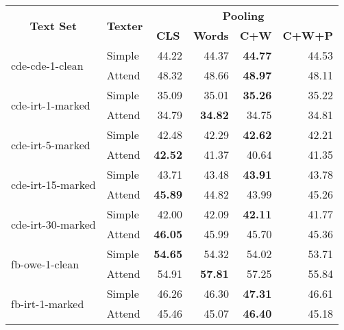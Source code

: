 \begin{tabular}{| l | l | r | r | r | r |}
    \hline

    \multicolumn{1}{|c|}{\multirow{2}{*}{\textbf{Text Set}}} &
    \multicolumn{1}{|c|}{\multirow{2}{*}{\textbf{Texter}}} &
    \multicolumn{4}{|c|}{\textbf{Pooling}} \\

    &
    &
    \multicolumn{1}{|c|}{\textbf{CLS}} &
    \multicolumn{1}{|c|}{\textbf{Words}} &
    \multicolumn{1}{|c|}{\textbf{C+W}} &
    \multicolumn{1}{|c|}{\textbf{C+W+P}} \\

    \hline \hline

    \multirow{2}{*}{cde-cde-1-clean}
    & Simple & 44.22 & 44.37 & \textbf{44.77} & 44.53 \\
    & Attend & 48.32 & 48.66 & \textbf{48.97} & 48.11 \\ \hline

    \multirow{2}{*}{cde-irt-1-marked}
    & Simple & 35.09 & 35.01 & \textbf{35.26} & 35.22 \\
    & Attend & 34.79 & \textbf{34.82} & 34.75 & 34.81 \\ \hline

    \multirow{2}{*}{cde-irt-5-marked}
    & Simple & 42.48 & 42.29 & \textbf{42.62} & 42.21 \\
    & Attend & \textbf{42.52} & 41.37 & 40.64 & 41.35 \\ \hline

    \multirow{2}{*}{cde-irt-15-marked}
    & Simple & 43.71 & 43.48 & \textbf{43.91} & 43.78 \\
    & Attend & \textbf{45.89} & 44.82 & 43.99 & 45.26 \\ \hline

    \multirow{2}{*}{cde-irt-30-marked}
    & Simple & 42.00 & 42.09 & \textbf{42.11} & 41.77 \\
    & Attend & \textbf{46.05} & 45.99 & 45.70 & 45.36 \\ \hline \hline

    \multirow{2}{*}{fb-owe-1-clean}
    & Simple & \textbf{54.65} & 54.32 & 54.02 & 53.71 \\
    & Attend & 54.91 & \textbf{57.81} & 57.25 & 55.84 \\ \hline

    \multirow{2}{*}{fb-irt-1-marked}
    & Simple & 46.26 & 46.30 & \textbf{47.31} & 46.61 \\
    & Attend & 45.46 & 45.07 & \textbf{46.40} & 45.18 \\ \hline


\end{tabular}
